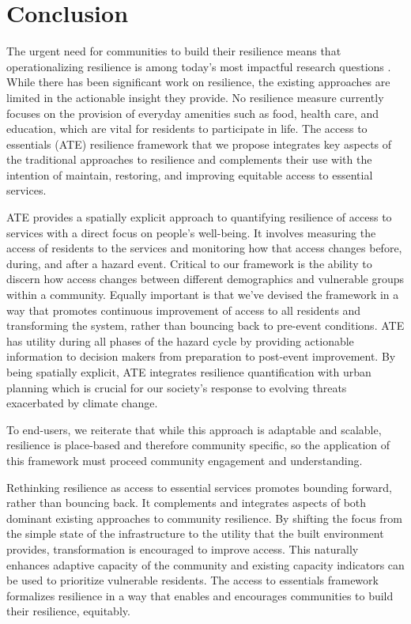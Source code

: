 \documentclass[9pt,twocolumn,twoside,lineno]{pnas-new}
\begin{document}
\section*{Conclusion}
The urgent need for communities to build their resilience means that operationalizing resilience is among today's most impactful research questions \cite{Caldarice2019-tv}.
While there has been significant work on resilience, the existing approaches are limited in the actionable insight they provide.
No resilience measure currently focuses on the provision of everyday amenities such as food, health care, and education, which are vital for residents to participate in life.
The access to essentials (ATE) resilience framework that we propose integrates key aspects of the traditional approaches to resilience and complements their use with the intention of maintain, restoring, and improving equitable access to essential services.

ATE provides a spatially explicit approach to quantifying resilience of access to services with a direct focus on people's well-being. 
It involves measuring the access of residents to the services and monitoring how that access changes before, during, and after a hazard event. 
Critical to our framework is the ability to discern how access changes between different demographics and vulnerable groups within a community.
Equally important is that we've devised the framework in a way that promotes continuous improvement of access to all residents and transforming the system, rather than bouncing back to pre-event conditions.
ATE has utility during all phases of the hazard cycle by providing actionable information to decision makers from preparation to post-event improvement.
By being spatially explicit, ATE integrates resilience quantification with urban planning which is crucial for our society's response to evolving threats exacerbated by climate change.

To end-users, we reiterate that while this approach is adaptable and scalable, resilience is place-based and therefore community specific, so the application of this framework must proceed community engagement and understanding.

Rethinking resilience as access to essential services promotes bounding forward, rather than bouncing back. It complements and integrates aspects of both dominant existing approaches to community resilience. By shifting the focus from the simple state of the infrastructure to the utility that the built environment provides, transformation is encouraged to improve access. This naturally enhances adaptive capacity of the community and existing capacity indicators can be used to prioritize vulnerable residents. The access to essentials framework formalizes resilience in a way that enables and encourages communities to build their resilience, equitably. 
\end{document}
